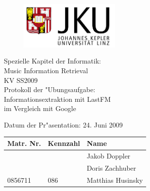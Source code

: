 
\begin{titlepage}

\begin{figure}[h!]
	\centering
  \includegraphics[width=5cm]{JKULogokurzWappenlinks_ger.jpg}
\end{figure}

\begin{center}
\vspace*{1.3cm}
{\Large Spezielle Kapitel der Informatik:\\Music Information Retrieval\\KV SS2009\\}
\vspace{4cm}
{ Protokoll der "Ubungsaufgabe:\\}{\huge Informationsextraktion mit LastFM \\ im Vergleich mit Google\\}
\vspace{4 cm}

{\Large Datum der Pr"asentation: 24. Juni 2009}
\vspace{0.5cm}


\begin{table}[h!]
\centering
\begin{tabular}{|p{3.5cm}|p{3.5cm}|p{6.5cm}|}
\hline \textbf{Matr. Nr.} & \textbf{Kennzahl} & \textbf{Name} \\
\hline
& & Jakob Doppler\\
\hline
& & Doris Zachhuber\\
\hline
0856711 & 086 & Matthias Husinsky\\
\hline
\end{tabular}
\end{table}

\end{center}

\end{titlepage}
\setcounter{page}{2}

